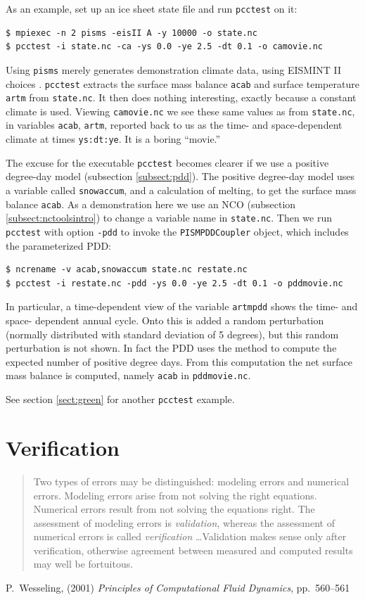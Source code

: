 \documentclass[11pt,final]{amsart}
\begin{document}
\bigskip
As an example, set up an ice sheet state file and run \verb|pcctest| on it:
\begin{verbatim}
$ mpiexec -n 2 pisms -eisII A -y 10000 -o state.nc
$ pcctest -i state.nc -ca -ys 0.0 -ye 2.5 -dt 0.1 -o camovie.nc
\end{verbatim}
Using \verb|pisms| merely generates demonstration climate data, using
EISMINT II choices \cite{EISMINT00}.  \verb|pcctest| extracts the 
surface mass balance \verb|acab| and surface temperature \verb|artm| from \verb|state.nc|.
It then does nothing interesting, exactly because a constant climate
is used.  Viewing \verb|camovie.nc| we see these same values as from \verb|state.nc|,
in variables \verb|acab|, \verb|artm|, reported back to us as the time- and space-dependent
climate at times \verb|ys:dt:ye|.  It is a boring ``movie.''

The excuse for the executable \verb|pcctest| becomes clearer if we use a positive degree-day
model (subsection \ref{subsect:pdd}).  The positive degree-day
model uses a variable called \verb|snowaccum|, and a calculation of melting, to get the
surface mass balance \verb|acab|.  As a demonstration here we use an NCO (subsection 
\ref{subsect:nctoolsintro}) to change a variable name in \verb|state.nc|.  Then we run \verb|pcctest|
with option \verb|-pdd| to invoke the \verb|PISMPDDCoupler|
object, which includes the parameterized PDD:
\begin{verbatim}
$ ncrename -v acab,snowaccum state.nc restate.nc
$ pcctest -i restate.nc -pdd -ys 0.0 -ye 2.5 -dt 0.1 -o pddmovie.nc
\end{verbatim}
In particular, a time-dependent view of the variable \verb|artmpdd| shows the time- and space-
dependent annual cycle.  Onto this is added a random perturbation (normally distributed with standard 
deviation of 5 degrees), but this random perturbation is not shown.  In fact the PDD uses the
\cite{CalovGreve05} method to compute the expected number of positive degree days.  From this
computation the net surface mass balance is computed, namely \verb|acab| in \verb|pddmovie.nc|.

See section \ref{sect:green} for another \verb|pcctest| example.


\clearpage\newpage
\section{Verification}\label{sect:verif}

\bigskip
\begin{quote}  Two types of errors may be distinguished: modeling errors and numerical errors.  Modeling errors arise from not solving the right equations.  Numerical errors result from not solving the equations right.  The assessment of modeling errors is \emph{validation}, whereas the assessment of numerical errors is called \emph{verification} \dots  Validation makes sense only after verification, otherwise agreement between measured and computed results may well be fortuitous.
\end{quote}
\hfill P.~Wesseling, (2001)  \emph{Principles of Computational Fluid Dynamics}, pp.~560--561 \cite{Wesseling}
\bigskip
\end{document}
